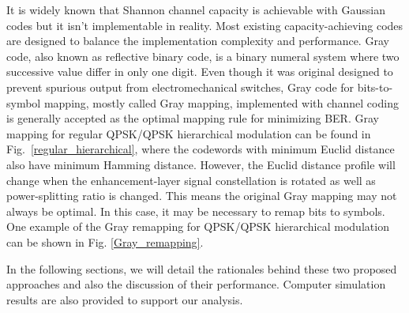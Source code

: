 \documentclass[10pt,fleqn, twocolumn]{IEEEtran}
\begin{document}
It is widely known that Shannon channel capacity is achievable
with Gaussian codes but it isn't implementable in reality. Most
existing capacity-achieving codes are designed to balance the
implementation complexity and performance. Gray code, also known
as reflective binary code, is a binary numeral system where two
successive value differ in only one digit. Even though it was
original designed to prevent spurious output from
electromechanical switches, Gray code for bits-to-symbol mapping,
mostly called Gray mapping, implemented with channel coding is
generally accepted as the optimal mapping rule for minimizing BER.
Gray mapping for regular QPSK/QPSK hierarchical modulation can be
found in Fig.~\ref{regular_hierarchical}, where the codewords with
minimum Euclid distance also have minimum Hamming distance.
However, the Euclid distance profile will change when the
enhancement-layer signal constellation is rotated as well as
power-splitting ratio is changed. This means the original Gray
mapping may not always be optimal. In this case, it may be
necessary to remap bits to symbols. One example of the Gray
remapping for QPSK/QPSK hierarchical modulation can be shown in
Fig. \ref{Gray_remapping}.
\begin{figure}
\end{figure}

In the following sections, we will detail the rationales behind
these two proposed approaches and also the discussion of their
performance. Computer simulation results are also provided to
support our analysis.
\end{document}
